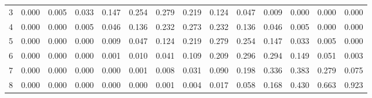 \documentclass[
]{article}
\begin{document}
\begin{table}[H]
\begin{tabular}{lrrrrrrrrrrrrr}
\hspace{1em}3 & 0.000 & 0.005 & 0.033 & 0.147 & 0.254 & 0.279 & 0.219 & 0.124 & 0.047 & 0.009 & 0.000 & 0.000 & 0.000\\
\hspace{1em}4 & 0.000 & 0.000 & 0.005 & 0.046 & 0.136 & 0.232 & 0.273 & 0.232 & 0.136 & 0.046 & 0.005 & 0.000 & 0.000\\
\hspace{1em}5 & 0.000 & 0.000 & 0.000 & 0.009 & 0.047 & 0.124 & 0.219 & 0.279 & 0.254 & 0.147 & 0.033 & 0.005 & 0.000\\
\hspace{1em}6 & 0.000 & 0.000 & 0.000 & 0.001 & 0.010 & 0.041 & 0.109 & 0.209 & 0.296 & 0.294 & 0.149 & 0.051 & 0.003\\
\hspace{1em}7 & 0.000 & 0.000 & 0.000 & 0.000 & 0.001 & 0.008 & 0.031 & 0.090 & 0.198 & 0.336 & 0.383 & 0.279 & 0.075\\
\hspace{1em}8 & 0.000 & 0.000 & 0.000 & 0.000 & 0.000 & 0.001 & 0.004 & 0.017 & 0.058 & 0.168 & 0.430 & 0.663 & 0.923\\
\bottomrule
\end{tabular}
\end{table}
\end{document}
